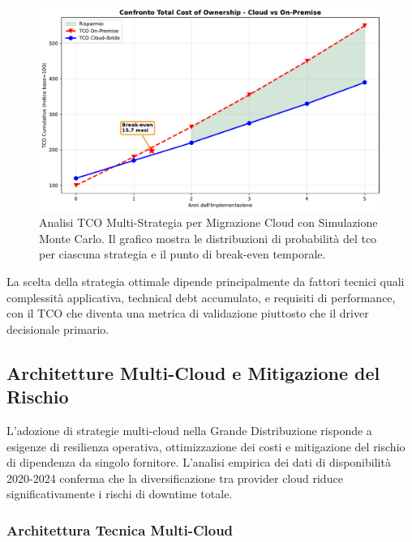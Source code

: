 \begin{figure}[htbp]
\centering
\includegraphics[width=\textwidth]{thesis_figures/cap3/fig_3_4_tco_comparison.pdf}
\caption{Analisi TCO Multi-Strategia per Migrazione Cloud con Simulazione Monte Carlo. Il grafico mostra le distribuzioni di probabilità del \gls{tco} per ciascuna strategia e il punto di break-even temporale.}
\label{fig:cloud_tco}
\end{figure}

La scelta della strategia ottimale dipende principalmente da fattori tecnici quali complessità applicativa, technical debt accumulato, e requisiti di performance, con il TCO che diventa una metrica di validazione piuttosto che il driver decisionale primario.%


\subsection{\texorpdfstring{\textbf{Architetture Multi-Cloud e Mitigazione del Rischio}}{3.4.2 - Architetture Multi-Cloud e Mitigazione del Rischio}}

L'adozione di strategie multi-cloud nella Grande Distribuzione risponde a esigenze di resilienza operativa, ottimizzazione dei costi e mitigazione del rischio di dipendenza da singolo fornitore. L'analisi empirica dei dati di disponibilità 2020-2024\autocite{Uptime2024} conferma che la diversificazione tra provider cloud riduce significativamente i rischi di downtime totale.

\subsubsection{\texorpdfstring{\textbf{Architettura Tecnica Multi-Cloud}}{3.4.2.1 - Architettura Tecnica Multi-Cloud}}

